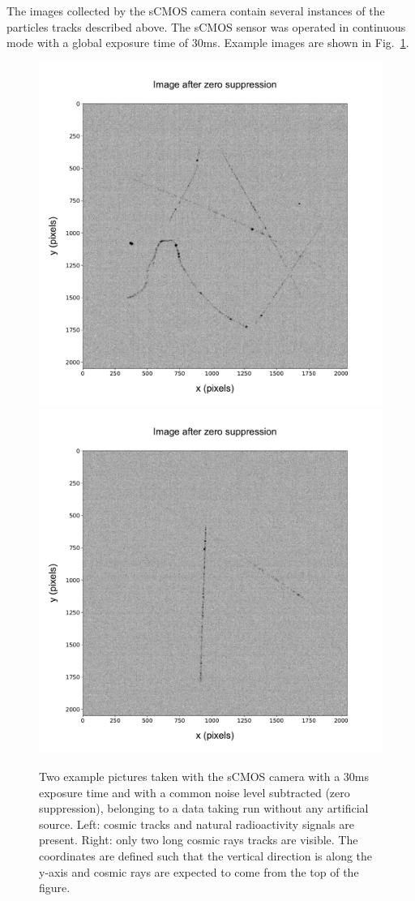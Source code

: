 \documentclass[12pt]{iopart}
\begin{document}
 The images collected by the sCMOS camera contain several instances of
 the particles tracks described above. The sCMOS sensor was operated
 in continuous mode with a global exposure time of
 30\unit{ms}. Example images are shown in
 Fig.~\ref{fig:typicalimage1}.

\begin{figure}[ht]
  \begin{center}
    \includegraphics[width=0.49\linewidth]{figures/pic_run02317_ev8_oriIma_paper}
    \includegraphics[width=0.49\linewidth]{figures/pic_run02156_ev527_oriIma_paper}
    \caption{Two example pictures taken with the sCMOS camera with a
      30\unit{ms} exposure time and with a common noise level
      subtracted (zero suppression), belonging to a data taking run
      without any artificial source. Left: cosmic tracks and natural
      radioactivity signals are present. Right: only two long cosmic
      rays tracks are visible. The coordinates are defined such that
      the vertical direction is along the y-axis and cosmic rays are
      expected to come from the top of the figure.
      \label{fig:typicalimage1}}
  \end{center}
\end{figure}
\end{document}
